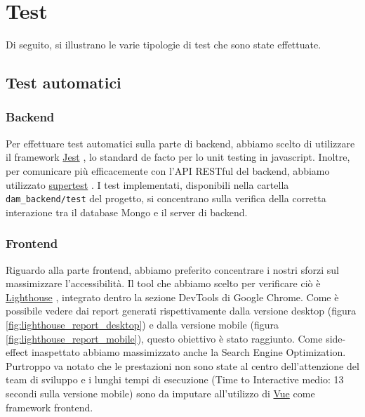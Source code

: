 \documentclass[a4paper,12pt]{report}
\newcommand{\vue}{\href{https://vuejs.org/}{Vue} }
\newcommand{\jest}{\href{https://jestjs.io/}{Jest} }
\newcommand{\supertest}{\href{https://www.npmjs.com/package/supertest}{supertest} }
\newcommand{\lighthouse}{\href{https://chrome.google.com/webstore/detail/lighthouse/blipmdconlkpinefehnmjammfjpmpbjk?hl=it}{Lighthouse} }
\begin{document}
\clearpage
\chapter{Test}\label{sec:testing}
Di seguito, si illustrano le varie tipologie di test che sono state effettuate.

\section{Test automatici}
\subsection{Backend}
Per effettuare test automatici sulla parte di backend, abbiamo scelto di utilizzare il framework \jest, lo standard de facto per lo unit testing in javascript. Inoltre, per comunicare più efficacemente con l'API RESTful del backend, abbiamo utilizzato \supertest. I test implementati, disponibili nella cartella \texttt{dam\_backend/test} del progetto, si concentrano sulla verifica della corretta interazione tra il database Mongo e il server di backend.

\subsection{Frontend}
Riguardo alla parte frontend, abbiamo preferito concentrare i nostri sforzi sul massimizzare l'accessibilità. Il tool che abbiamo scelto per verificare ciò è \lighthouse, integrato dentro la sezione DevTools di Google Chrome. Come è possibile vedere dai report generati rispettivamente dalla versione desktop (figura \ref{fig:lighthouse_report_desktop}) e dalla versione mobile (figura \ref{fig:lighthouse_report_mobile}), questo obiettivo è stato raggiunto. Come side-effect inaspettato abbiamo massimizzato anche la Search Engine Optimization. Purtroppo va notato che le prestazioni non sono state al centro dell'attenzione del team di sviluppo e i lunghi tempi di esecuzione (Time to Interactive medio: 13 secondi sulla versione mobile) sono da imputare all'utilizzo di \vue come framework frontend.
\end{document}
